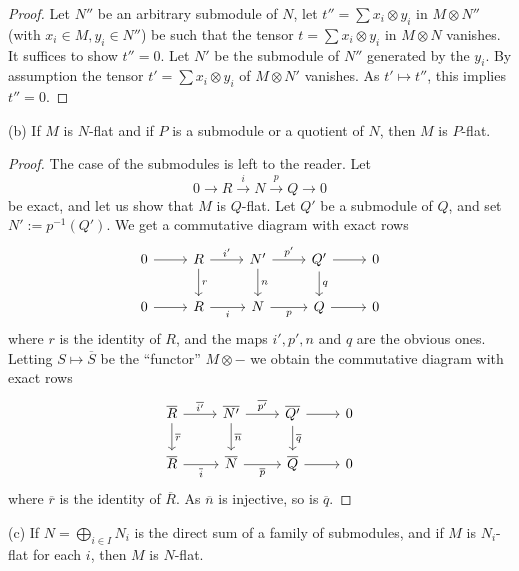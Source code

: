 \documentclass[parskip=half]{scrartcl}%
\begin{document}
\begin{proof} 
Let $N''$ be an arbitrary submodule of $N$, let $t''=\sum x_i\otimes y_i$ in $M\otimes N''$ (with $x_i\in M,y_i\in N''$) be such that the tensor $t=\sum x_i\otimes y_i$ in $M\otimes N$ vanishes. It suffices to show $t''=0$. Let $N'$ be the submodule of $N''$ generated by the $y_i$. By assumption the tensor $t'=\sum x_i\otimes y_i$ of $M\otimes N'$ vanishes. As $t'\mapsto t''$, this implies $t''=0$. 
\end{proof}

(b) If $M$ is $N$-flat and if $P$ is a submodule or a quotient of $N$, then $M$ is $P$-flat.%

\begin{proof} 
The case of the submodules is left to the reader. Let 
$$
0\to R\xrightarrow iN\xrightarrow pQ\to0
$$ 
be exact, and let us show that $M$ is $Q$-flat. Let $Q'$ be a submodule of $Q$, and set $N':=p^{-1}(Q')$. We get a commutative diagram with exact rows
$$
\begin{tikzcd}
0\ar[r]&R\ar[d,"r"]\ar[r,"i'"]&N'\ar[d,"n"]\ar[r,"p'"]& Q'\ar[d,"q"]\ar[r]&0\\ 
0\ar[r]&R\ar[r,"i"']&N\ar[r,"p"']& Q\ar[r]&0
\end{tikzcd}
$$ 
where $r$ is the identity of $R$, and the maps $i',p',n$ and $q$ are the obvious ones. Letting $S\mapsto\overline S$ be the ``functor'' $M\otimes-$ we obtain the commutative diagram with exact rows
$$
\begin{tikzcd}
\overline R\ar[d,"\overline r"]\ar[r,"\overline{i'}"]&\overline{N'}\ar[d,"\overline n"]\ar[r,"\overline{p'}"]& \overline{Q'}\ar[d,"\overline q"]\ar[r]&0\\ 
\overline R\ar[r,"\overline i"']&\overline N\ar[r,"\overline p"']& \overline Q\ar[r]&0
\end{tikzcd}
$$ 
where $\overline r$ is the identity of $\overline R$. As $\overline n$ is injective, so is $\overline q$. 
\end{proof}

(c) If $N=\bigoplus_{i\in I}N_i$ is the direct sum of a family of submodules, and if $M$ is $N_i$-flat for each $i$, then $M$ is $N$-flat.%
\end{document}
